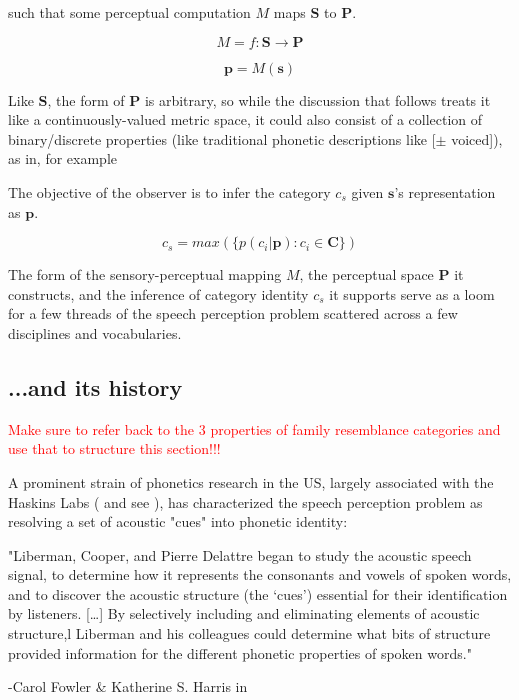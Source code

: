 such that some perceptual computation $M$ maps $\mathbf{S}$ to $\mathbf{P}$.

\begin{equation}
\label{eqn:map}
M = f: \mathbf{S} \to \mathbf{P}
\end{equation} 

\begin{equation}
\label{eqn:pfroms}
\mathbf{p} = M(\mathbf{s})
\end{equation}

Like $\mathbf{S}$, the form of $\mathbf{P}$ is arbitrary, so while the discussion that follows treats it like a continuously-valued metric space, it could also consist of a collection of binary/discrete properties (like traditional phonetic descriptions like [$\pm$ voiced]), as in, for example \citep{Tversky1977,leeExtendingALCOVEModel2002}

The objective of the observer is to infer the category $c_s$ given $\mathbf{s}$'s representation as $\mathbf{p}$.

\begin{equation}
\label{eqn:infer}
c_s = max( \{ p(c_i | \mathbf{p}) : c_i \in \mathbf{C} \})
\end{equation}

The form of the sensory-perceptual mapping $M$, the perceptual space $\mathbf{P}$ it constructs, and the inference of category identity $c_s$ it supports serve as a loom for a few threads of the speech perception problem scattered across a few disciplines and vocabularies.

\subsection{...and its history}

\textcolor{red}{Make sure to refer back to the 3 properties of family resemblance categories and use that to structure this section!!!}

A prominent strain of phonetics research in the US, largely associated with the Haskins Labs (\citep{schertzPhoneticCueWeighting2020} and see \citep[p.~51]{ohalaGuideHistoryPhonetic1999}), has characterized the speech perception problem as resolving a set of acoustic "cues" into phonetic identity:

\begin{leftbar}
"Liberman, Cooper, and Pierre Delattre began to study the acoustic speech signal, to determine how it represents the consonants and vowels of spoken words, and to discover the acoustic structure (the `cues') essential for their identification by listeners. [\dots] By selectively including and eliminating elements of acoustic structure,l Liberman and his colleagues could determine what bits of structure provided information for the different phonetic properties of spoken words."

-Carol Fowler \& Katherine S. Harris in \citep[p.~51]{ohalaGuideHistoryPhonetic1999}
\end{leftbar}

